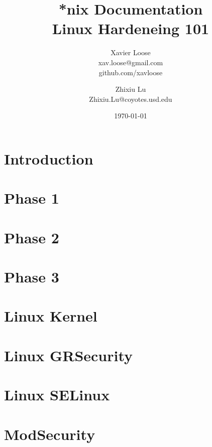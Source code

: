 \documentclass[11pt, letterpaper, oneside, titlepage]{article}
\title{*nix Documentation \\\large Linux Hardeneing 101}
\author{ Xavier Loose \\ xav.loose@gmail.com \\ github.com/xavloose \and Zhixiu Lu \\ Zhixiu.Lu@coyotes.usd.edu }
\date{\today}
\begin{document}
  \maketitle
  \part{Introduction}
    
    
    \newpage
  \part{Phase 1}
    
    \newpage
  \part{Phase 2}
    
    \newpage
  \part{Phase 3}
    
    \newpage
  \part{Linux Kernel}
    
    
    
    \newpage
  \part{Linux GRSecurity}
  \part{Linux SELinux}
  \part{ModSecurity}
    
    \newpage
\end{document}
